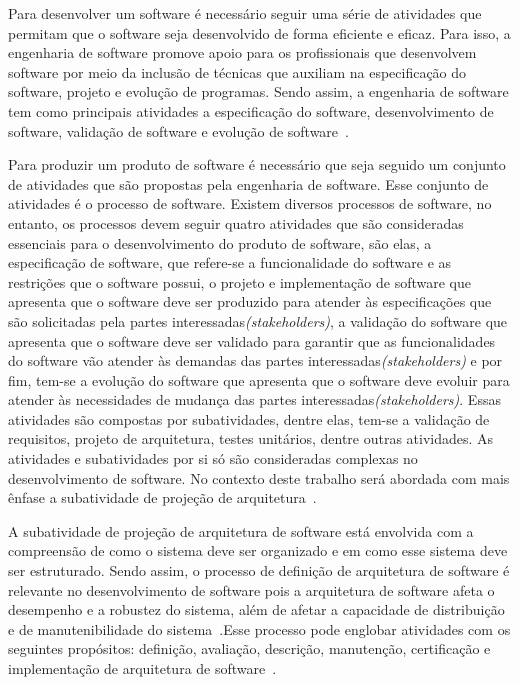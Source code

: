 Para desenvolver um software é necessário seguir uma série de atividades que permitam que o software seja desenvolvido de forma eficiente e eficaz. Para isso, a engenharia de software promove apoio para os profissionais que desenvolvem software por meio da inclusão de técnicas que auxiliam na especificação do software, projeto e evolução de programas. Sendo assim, a engenharia de software tem como principais atividades a especificação do software, desenvolvimento de software, validação de software e evolução de software~\cite{Sommerville_2011_texbook}. 

Para produzir um produto de software é necessário que seja seguido um conjunto de atividades que são propostas pela engenharia de software. Esse conjunto de atividades é o processo de software. Existem diversos processos de software, no entanto, os processos devem seguir quatro atividades que são consideradas essenciais para o desenvolvimento do produto de software, são elas, a especificação de software, que refere-se a funcionalidade do software e as restrições que o software possui, o projeto e implementação de software que apresenta que o software deve ser produzido para atender às especificações que são solicitadas pela partes interessadas\emph{(stakeholders)}, a validação do software que apresenta que o software deve ser validado para garantir que as funcionalidades do software vão atender às demandas das partes interessadas\emph{(stakeholders)} e por fim, tem-se a evolução do software que apresenta que o software deve evoluir para atender às necessidades de mudança das partes interessadas\emph{(stakeholders)}. Essas atividades são compostas por subatividades, dentre elas, tem-se a validação de requisitos, projeto de arquitetura, testes unitários, dentre outras atividades. As atividades e subatividades por si só são consideradas complexas no desenvolvimento de software. No contexto deste trabalho será abordada com mais ênfase a subatividade de projeção de arquitetura~\cite{Sommerville_2011_texbook}.

A subatividade de projeção de arquitetura de software está envolvida com a compreensão de como o sistema deve ser organizado e em como esse sistema deve ser estruturado. Sendo assim, o processo de definição de arquitetura de software é relevante no desenvolvimento de software pois a arquitetura de software afeta o desempenho e a robustez do sistema, além de afetar a capacidade de distribuição e de manutenibilidade do sistema~\cite{Sommerville_2011_texbook}.Esse processo pode englobar atividades com os seguintes propósitos: definição, avaliação, descrição, manutenção, certificação e implementação de arquitetura de software~\cite{ISO_1471}.


